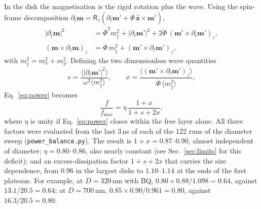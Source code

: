 \documentclass[11pt,a4paper]{article}
\newcommand{\vect}[1]{\mathbf{#1}}
\newcommand{\uv}[1]{\hat{\mathbf{#1}}}
\begin{document}
In the disk the magnetisation is the rigid rotation plus the wave.  Using the spin-frame decomposition
$\partial_t\vect m=\mathsf R_z(\partial_t\vect m'+\dot\Phi\,\uv z\times\vect m')$,
\begin{align}
|\partial_t\vect m|^2&=\dot\Phi^2m_\parallel^2+|\partial_t\vect m'|^2+2\dot\Phi\,(\vect m'\times\partial_t\vect m')_z,\\
(\vect m\times\partial_t\vect m)_z&=\dot\Phi\,m_\parallel^2+(\vect m'\times\partial_t\vect m')_z,
\end{align}
with $m_\parallel^2=m_x^2+m_y^2$.  Defining the two dimensionless wave quantities
\begin{equation}
s=\frac{\langle|\partial_t\vect m'|^2\rangle}{\omega^2\langle m_\parallel^2\rangle},\qquad
x=\frac{\langle(\vect m'\times\partial_t\vect m')_z\rangle}{\dot\Phi\,\langle m_\parallel^2\rangle},
\end{equation}
Eq.~\eqref{eq:power} becomes
\begin{equation}
\frac{f}{f_\mathrm{mac}}=\eta\,\frac{1+x}{1+s+2x},
\label{eq:fratio}
\end{equation}
where $\eta$ is unity if Eq.~\eqref{eq:power} closes within the free layer alone.  All three factors were
evaluated from the last 3\,ns of each of the 122 runs of the diameter sweep (\texttt{power\_balance.py}).
The result is $1+x=0.87$--$0.90$, almost independent of diameter; $\eta=0.80$--$0.86$, also nearly constant
(see Sec.~\ref{sec:limits} for this deficit); and an excess-dissipation factor $1+s+2x$ that carries the size
dependence, from $0.96$ in the largest disks to $1.10$--$1.14$ at the ends of the first plateaus.  For example,
at $D=320$\,nm with BQ, $0.80\times0.88/1.098=0.64$, against $13.1/20.5=0.64$; at $D=700$\,nm,
$0.85\times0.90/0.961=0.80$, against $16.3/20.5=0.80$.
\end{document}

